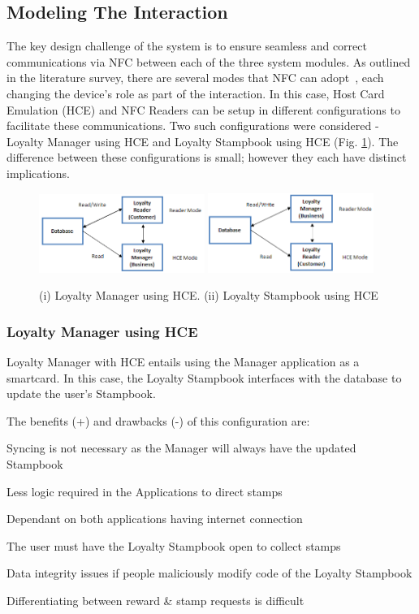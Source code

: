 \subsection{Modeling The Interaction}
The key design challenge of the system is to ensure seamless and correct communications via NFC between each of the three system modules. As outlined in the literature survey, there are several modes that NFC can adopt~\cite{4278549}, each changing the device's role as part of the interaction. In this case, Host Card Emulation (HCE) and NFC Readers can be setup in different configurations to facilitate these communications. Two such configurations were considered - Loyalty Manager using HCE and Loyalty Stampbook using HCE (Fig. \ref{fig:dArches}). The difference between these configurations is small; however they each have distinct implications.

\begin{figure}[H]
 \centering
  \includegraphics[width=0.48\textwidth]{img/dArch1.png}
   \includegraphics[width=0.48\textwidth]{img/dArch2.png}
    \caption{(i) Loyalty Manager using HCE. (ii) Loyalty Stampbook using HCE}
     \label{fig:dArches}
\end{figure}

\subsubsection{Loyalty Manager using HCE}
Loyalty Manager with HCE entails using the Manager application as a smartcard. In this case, the Loyalty Stampbook interfaces with the database to update the user's Stampbook. 

The benefits (+) and drawbacks (-) of this configuration are: 
\begin{description}[leftmargin=!,labelwidth=\widthof{\bfseries small}]
    \item[+] Syncing is not necessary as the Manager will always have the updated Stampbook
    \item[+] Less logic required in the Applications to direct stamps
    \item[---] Dependant on both applications having internet connection
    \item[---] The user must have the Loyalty Stampbook open to collect stamps
    \item[---] Data integrity issues if people maliciously modify code of the Loyalty Stampbook 
    \item[---] Differentiating between  reward \& stamp requests is difficult
\end{description}
